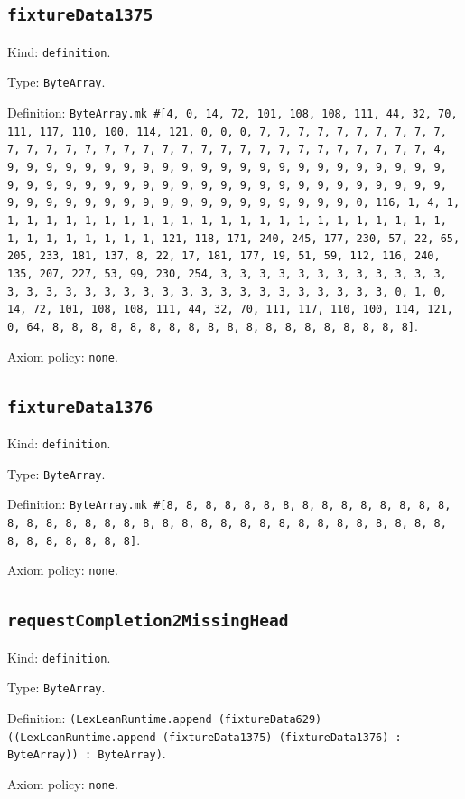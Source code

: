 \documentclass[11pt]{article}
\begin{document}
\subsection*{\texttt{fixtureData1375}}
\noindent Kind: \texttt{definition}.\par
\noindent Type: \texttt{ByteArray}.\par
\noindent Definition: \texttt{ByteArray.mk \#[4, 0, 14, 72, 101, 108, 108, 111, 44, 32, 70, 111, 117, 110, 100, 114, 121, 0, 0, 0, 7, 7, 7, 7, 7, 7, 7, 7, 7, 7, 7, 7, 7, 7, 7, 7, 7, 7, 7, 7, 7, 7, 7, 7, 7, 7, 7, 7, 7, 7, 7, 7, 4, 9, 9, 9, 9, 9, 9, 9, 9, 9, 9, 9, 9, 9, 9, 9, 9, 9, 9, 9, 9, 9, 9, 9, 9, 9, 9, 9, 9, 9, 9, 9, 9, 9, 9, 9, 9, 9, 9, 9, 9, 9, 9, 9, 9, 9, 9, 9, 9, 9, 9, 9, 9, 9, 9, 9, 9, 9, 9, 9, 9, 9, 9, 9, 9, 0, 116, 1, 4, 1, 1, 1, 1, 1, 1, 1, 1, 1, 1, 1, 1, 1, 1, 1, 1, 1, 1, 1, 1, 1, 1, 1, 1, 1, 1, 1, 1, 1, 1, 1, 1, 121, 118, 171, 240, 245, 177, 230, 57, 22, 65, 205, 233, 181, 137, 8, 22, 17, 181, 177, 19, 51, 59, 112, 116, 240, 135, 207, 227, 53, 99, 230, 254, 3, 3, 3, 3, 3, 3, 3, 3, 3, 3, 3, 3, 3, 3, 3, 3, 3, 3, 3, 3, 3, 3, 3, 3, 3, 3, 3, 3, 3, 3, 3, 3, 0, 1, 0, 14, 72, 101, 108, 108, 111, 44, 32, 70, 111, 117, 110, 100, 114, 121, 0, 64, 8, 8, 8, 8, 8, 8, 8, 8, 8, 8, 8, 8, 8, 8, 8, 8, 8, 8, 8]}.\par
\noindent Axiom policy: \texttt{none}.\par
\subsection*{\texttt{fixtureData1376}}
\noindent Kind: \texttt{definition}.\par
\noindent Type: \texttt{ByteArray}.\par
\noindent Definition: \texttt{ByteArray.mk \#[8, 8, 8, 8, 8, 8, 8, 8, 8, 8, 8, 8, 8, 8, 8, 8, 8, 8, 8, 8, 8, 8, 8, 8, 8, 8, 8, 8, 8, 8, 8, 8, 8, 8, 8, 8, 8, 8, 8, 8, 8, 8, 8, 8, 8]}.\par
\noindent Axiom policy: \texttt{none}.\par
\subsection*{\texttt{requestCompletion2MissingHead}}
\noindent Kind: \texttt{definition}.\par
\noindent Type: \texttt{ByteArray}.\par
\noindent Definition: \texttt{(LexLeanRuntime.append (fixtureData629) ((LexLeanRuntime.append (fixtureData1375) (fixtureData1376) : ByteArray)) : ByteArray)}.\par
\noindent Axiom policy: \texttt{none}.\par
\end{document}
